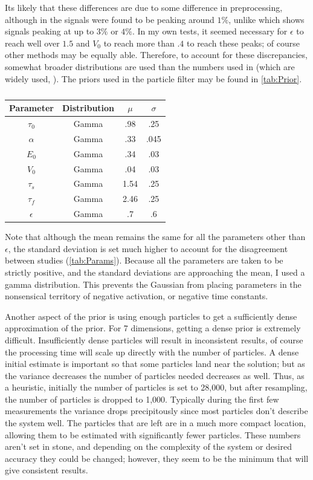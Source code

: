 Its likely that these differences are due to some difference in preprocessing,
although in \cite{Deneux2006} the signals were found to be peaking around
$1\%$, unlike \cite{Friston2000} which shows signals peaking at up to
$3\%$ or $4\%$. In my own tests, it seemed necessary for $\epsilon$ to
reach well over $1.5$ and $V_0$ to reach more than $.4$ to reach these
peaks; of course other methods may be equally able. 
Therefore, to account for these discrepancies, somewhat broader
distributions are used than the numbers used in \cite{Friston2000}
(which are widely used, \cite{Hu2009}). The 
priors used in the particle filter may be found in \autoref{tab:Prior}.

\begin{table}[t]
\centering
\begin{tabular}{|c || c | c | c |}
\hline 
Parameter & Distribution & $\mu$ & $\sigma$ \\
\hline
$\tau_0$ & Gamma & .98 & .25 \\
$\alpha$ & Gamma & .33 & .045\\
$E_0$    & Gamma & .34 & .03  \\
$V_0$    & Gamma & .04 & .03 \\
$\tau_s$ & Gamma & 1.54  & .25\\
$\tau_f$ & Gamma & 2.46  & .25\\
$\epsilon$ & Gamma & .7  & .6 \\
\hline
\end{tabular}
\caption{}
\label{tab:Prior} 
\end{table}

Note that although the mean remains the same for all the 
parameters other than $\epsilon$, the standard deviation is set
much higher to account for the disagreement between studies
(\autoref{tab:Params}). 
Because all the parameters are taken to be strictly positive, and the
standard deviations are approaching the mean, I used a gamma distribution.
This prevents the Gaussian from placing parameters in the nonsensical 
territory of negative activation, or negative time constants.

Another aspect of the prior is using enough particles to get a 
sufficiently dense approximation of the prior. For 7 dimensions,
getting a dense prior is extremely difficult. Insufficiently
dense particles will result in inconsistent results, of course the
processing time will scale up directly with the number of particles.
A dense initial estimate is important so that some particles land
near the solution; but as the variance decreases the number of 
particles needed decreases as well. Thus, as a heuristic, initially
the number of particles is set to 28,000, but after resampling,
the number of particles is dropped to 1,000. Typically during the 
first few measurements the variance drops precipitously since most particles
don't describe the system well. The particles that are left are in a
much more compact location, allowing them to be estimated with 
significantly fewer particles. These numbers aren't set in stone,
and depending on the complexity of the system or desired accuracy
they could be changed; however, they seem to be the minimum that
will give consistent results.

